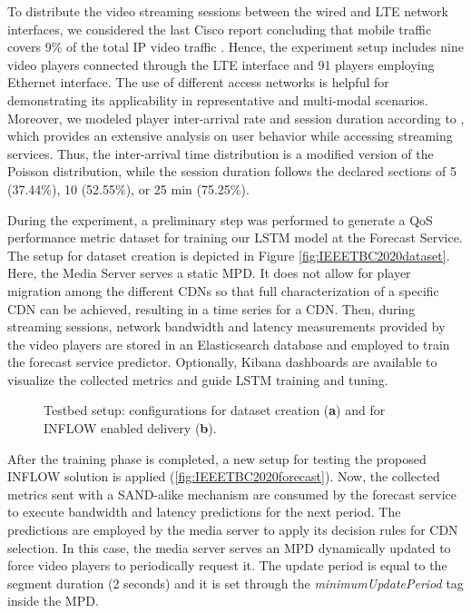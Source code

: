 To distribute the video streaming sessions between the wired and LTE network interfaces, we considered the last Cisco report concluding that mobile traffic covers 9\% of the total IP video traffic \cite{ciscovideo2017}. Hence, the experiment setup includes nine video players connected through the LTE interface and 91 players employing Ethernet interface. The use of different access networks is helpful for demonstrating its applicability in representative and multi-modal scenarios. Moreover, we modeled player inter-arrival rate and session duration according to \cite{yu2006}, which provides an extensive analysis on user behavior while accessing streaming services. Thus, the inter-arrival time distribution is a modified version of the Poisson distribution, while the session duration follows the declared sections of 5 (37.44\%), 10 (52.55\%), or 25 min (75.25\%).

During the experiment, a preliminary step was performed to generate a QoS performance metric dataset for training our LSTM model at the Forecast Service. The setup for dataset creation is depicted in Figure \ref{fig:IEEETBC2020dataset}. Here, the Media Server serves a static MPD. It does not allow for player migration among the different CDNs so that full characterization of a specific CDN can be achieved, resulting in a time series for a CDN. Then, during streaming sessions, network bandwidth and latency measurements provided by the video players are stored in an Elasticsearch \cite{gormley2015} database and employed to train the forecast service predictor. Optionally, Kibana \cite{gupta2015-2} dashboards are available to visualize the collected metrics and guide LSTM training and tuning.

\begin{figure}[htp]
	\centering
	\hfil
	\caption{Testbed setup: configurations for dataset creation (\textbf{a}) and for INFLOW enabled delivery (\textbf{b}).}
	\label{fig:IEEETBC2020setup}
\end{figure}

After the training phase is completed, a new setup for testing the proposed INFLOW solution is applied (\ref{fig:IEEETBC2020forecast}). Now, the collected metrics sent with a SAND-alike mechanism are consumed by the forecast service to execute bandwidth and latency predictions for the next period. The predictions are employed by the media server to apply its decision rules for CDN selection. In this case, the media server serves an MPD dynamically updated to force video players to periodically request it. The update period is equal to the segment duration (2 seconds) and it is set through the \textit{minimumUpdatePeriod} tag inside the MPD.

